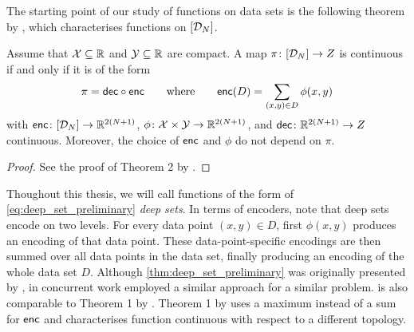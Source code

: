 \documentclass[12pt, twoside]{report}
\begin{document}
The starting point of our study of functions on data sets is the following theorem by \textcite{Zaheer:2017:Deep_Sets}, which characterises functions on $[\D_N]$.

\begin{theorem} \label{thm:deep_set_preliminary}
    Assume that $\X \sub \R$ and $\Y \sub \R$ are compact.
    A map $\pi \colon [\D_N] \to Z$ is continuous if and only if it is of the form
    \begin{equation} \label{eq:deep_set_preliminary}
        \pi = \dec \comp \enc \qquad \text{where} \qquad
        \enc(D) = \sum_{\smash{(x, y) \in D}} \phi(x, y)
    \end{equation}
    with $\enc \colon [\D_N] \to \smash{\R^{2(N+1)}}$,
    $\phi\colon \X \times \Y \to \smash{\R^{2(N+1)}}$, and
    $\dec \colon \smash{\R^{2(N+1)}} \to Z$ continuous.
    Moreover, the choice of $\enc$ and $\phi$ do not depend on $\pi$.
\end{theorem}
\begin{proof}
    See the proof of Theorem 2 by \textcite{Zaheer:2017:Deep_Sets}.
\end{proof}

Thoughout this thesis, we will call functions of the form of \eqref{eq:deep_set_preliminary} \emph{deep sets}.
In terms of encoders, note that deep sets encode on two levels.
For every data point $(x, y) \in D$, first $\phi(x, y)$ produces an encoding of that data point.
These data-point-specific encodings are then summed over all data points in the data set, finally producing an encoding of the whole data set $D$.
Although \cref{thm:deep_set_preliminary} was originally presented by \textcite{Zaheer:2017:Deep_Sets}, in concurrent work \textcite{Edwards:2017:Towards_a_Neural_Statistician} employed a similar approach for a similar problem.
 is also comparable to Theorem 1 by \textcite{Qi:2017:PointNet_Deep_Learning_on_Point}.
Theorem 1 by \textcite{Qi:2017:PointNet_Deep_Learning_on_Point} uses a maximum instead of a sum for $\enc$ and characterises function continuous with respect to a different topology.
\end{document}
